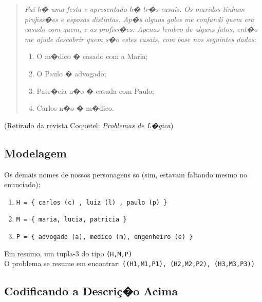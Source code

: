 \documentclass[final,a4paper]{article}
\begin{document}
\begin{quotation}

{\em Fui h� uma festa e  apresentado h� tr�s casais.
Os maridos tinham profiss�es  e esposas distintas. 
Ap�s alguns {\em goles} me confundi quem era casado com quem,
e as profiss�es.
Apenas lembro de alguns fatos, ent�o me ajude descobrir quem
s�o estes casais, com base nos seguintes dados}:
\begin{enumerate}
\item  O m�dico � casado com a Maria;
\item  O Paulo � advogado;
\item  Patr�cia n�o � casada com Paulo;
\item  Carlos n�o � m�dico.
\end{enumerate}
\end{quotation}

(Retirado da revista Coquetel: {\em Problemas de L�gica})

\subsection{Modelagem}
Os demais nomes de nossos personagens so (sim, estavam faltando mesmo no
enunciado):
\begin{enumerate}

\item \texttt{H = \{ carlos (c) , luiz (l) , paulo (p) \}}
\item \texttt{M = \{ maria, lucia, patricia \}}
\item \texttt{P = \{ advogado (a), medico (m), engenheiro (e) \}}
\end{enumerate}
Em resumo, um tupla-3 do tipo \texttt{(H,M,P)} \\

O problema se resume em encontrar: \texttt{((H1,M1,P1), (H2,M2,P2), (H3,M3,P3))}

\subsection{Codificando a Descri\c{c}�o Acima}
\end{document}
